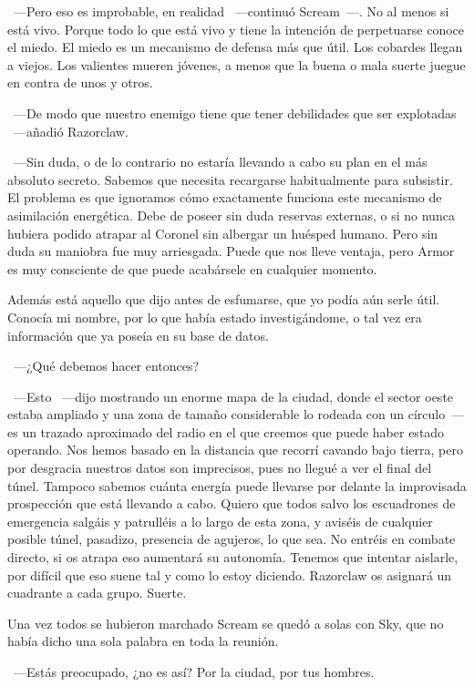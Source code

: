 ~---Pero eso es improbable, en realidad ~---continuó Scream~---. No al menos si está vivo. Porque todo lo que está vivo y tiene la intención de perpetuarse conoce el miedo. El miedo es un mecanismo de defensa más que útil. Los cobardes llegan a viejos. Los valientes mueren jóvenes, a menos que la buena o mala suerte juegue en contra de unos y otros.

~---De modo que nuestro enemigo tiene que tener debilidades que ser explotadas ~---añadió Razorclaw.

~---Sin duda, o de lo contrario no estaría llevando a cabo su plan en el más absoluto secreto. Sabemos que necesita recargarse habitualmente para subsistir. El problema es que ignoramos cómo exactamente funciona este mecanismo de asimilación energética. Debe de poseer sin duda reservas externas, o si no nunca hubiera podido atrapar al Coronel sin albergar un huésped humano. Pero sin duda su maniobra fue muy arriesgada. Puede que nos lleve ventaja, pero Armor es muy consciente de que puede acabársele en cualquier momento.

\rquoti Además está aquello que dijo antes de esfumarse, que yo podía aún serle útil. Conocía mi nombre, por lo que había estado investigándome, o tal vez era información que ya poseía en su base de datos.

~---¿Qué debemos hacer entonces?

~---Esto ~---dijo mostrando un enorme mapa de la ciudad, donde el sector oeste estaba ampliado y una zona de tamaño considerable lo rodeada con un círculo~--- es un trazado aproximado del radio en el que creemos que puede haber estado operando. Nos hemos basado en la distancia que recorrí cavando bajo tierra, pero por desgracia nuestros datos son imprecisos, pues no llegué a ver el final del túnel. Tampoco sabemos cuánta energía puede llevarse por delante la improvisada prospección que está llevando a cabo. Quiero que todos salvo los escuadrones de emergencia salgáis y patrulléis a lo largo de esta zona, y aviséis de cualquier posible túnel, pasadizo, presencia de agujeros, lo que sea. No entréis en combate directo, si os atrapa eso aumentará su autonomía. Tenemos que intentar aislarle, por difícil que eso suene tal y como lo estoy diciendo. Razorclaw os asignará un cuadrante a cada grupo. Suerte.

Una vez todos se hubieron marchado Scream se quedó a solas con Sky, que no había dicho una sola palabra en toda la reunión.

~---Estás preocupado, ¿no es así? Por la ciudad, por tus hombres.

